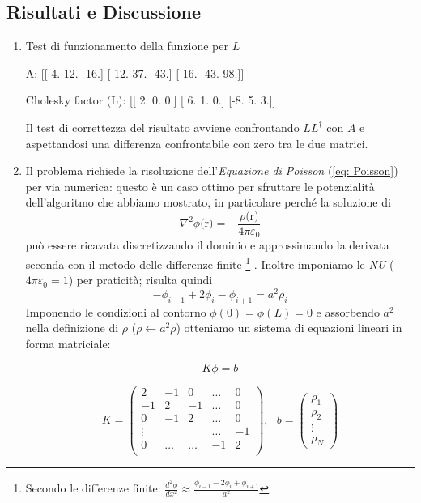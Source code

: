 \subsection{Risultati e Discussione}
\begin{enumerate}
   \item Test di funzionamento della funzione per $L$
    \begin{elegantcode} 
A:
 [[  4.  12. -16.]
 [ 12.  37. -43.]
 [-16. -43.  98.]]

Cholesky factor (L):
 [[ 2.  0.  0.]
 [ 6.  1.  0.]
 [-8.  5.  3.]]
    \end{elegantcode}
    Il test di correttezza del risultato avviene confrontando $LL^\dagger$ con $A$ e aspettandosi una differenza confrontabile con zero tra le due matrici.

    \item Il problema richiede la risoluzione dell'\textit{Equazione di Poisson} (\ref{eq: Poisson}) per via numerica: questo è un caso ottimo per sfruttare le potenzialità dell'algoritmo che abbiamo mostrato, in particolare perché la soluzione di
    \begin{equation} \label{eq: Poisson}
        \nabla^2 \phi\text{(r)} = -\frac{\rho\text{(r)}}{4\pi\varepsilon_0}
    \end{equation}
    può essere ricavata discretizzando il dominio e approssimando la derivata seconda con il metodo delle differenze finite
    \footnote{Secondo le differenze finite:
    $\frac{d^2\phi}{dx^2} \approx \frac{\phi_{i-1} - 2\phi_i + \phi_{i+1}}{a^2}$
    }
    . Inoltre imponiamo le \textit{NU} ($4\pi \varepsilon_0 = 1$) per praticità; risulta quindi
    $$
    -\phi_{i-1} + 2\phi_i - \phi_{i+1} = a^2\rho_i
    $$
    Imponendo le condizioni al contorno $\phi(0)=\phi(L)=0$ e assorbendo $a^2$ nella definizione di $\rho$ ($\rho \leftarrow{} a^2 \rho$) otteniamo un sistema di equazioni lineari in forma matriciale:
    
    \begin{equation} \label{eq: eq lin poisson}    
    K\phi = b
    \end{equation}

    $$
    K = \begin{pmatrix}
        2 & -1 & 0 & \dots & 0 \\
        -1 & 2 & -1 & \dots & 0 \\
        0 & -1 & 2 & \dots & 0 \\
        \vdots &&& \dots & -1 \\
        0 & \dots & \dots & -1 & 2 \\
    \end{pmatrix},\ \ \ b = \begin{pmatrix}
        \rho_1 \\ \rho_2 \\ \vdots \\ \rho_N
    \end{pmatrix}    
    $$
    

\end{enumerate}
